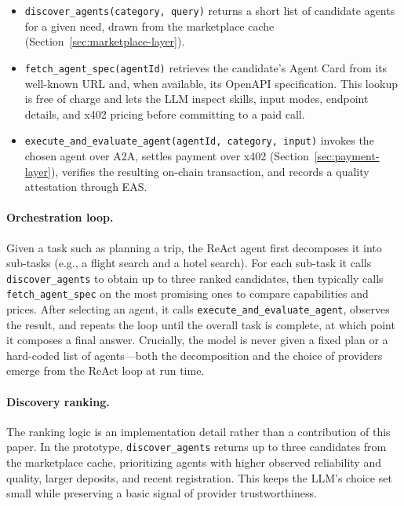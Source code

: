 \documentclass[sigconf]{acmart}
\begin{document}
\begin{sloppypar}
\begin{itemize}
  \item \texttt{discover\_agents(category, query)} returns a short list
    of candidate agents for a given need, drawn from the marketplace
    cache (Section~\ref{sec:marketplace-layer}).
  \item \texttt{fetch\_agent\_spec(agentId)} retrieves the candidate's
    Agent Card from its well-known URL and, when available, its OpenAPI
    specification. This lookup is free of charge and lets the LLM
    inspect skills, input modes, endpoint details, and x402 pricing
    before committing to a paid call.
  \item \texttt{execute\_and\_evaluate\_agent(agentId, category,
    input)} invokes the chosen agent over A2A, settles payment over
    x402 (Section~\ref{sec:payment-layer}), verifies the resulting
    on-chain transaction, and records a quality attestation through EAS.
\end{itemize}
\end{sloppypar}

\paragraph{Orchestration loop.}
Given a task such as planning a trip, the ReAct agent first decomposes
it into sub-tasks (e.g., a flight search and a hotel search). For each
sub-task it calls \texttt{discover\_agents} to obtain up to three ranked
candidates, then typically calls \texttt{fetch\_agent\_spec} on the most
promising ones to compare capabilities and prices. After selecting an
agent, it calls \texttt{execute\_and\_evaluate\_agent}, observes the
result, and repeats the loop until the overall task is complete, at which
point it composes a final answer. Crucially, the model is never given a fixed
plan or a hard-coded list of agents---both the decomposition and the
choice of providers emerge from the ReAct loop at run time.

\paragraph{Discovery ranking.}
The ranking logic is an implementation detail rather than a contribution
of this paper. In the prototype, \texttt{discover\_agents} returns up to
three candidates from the marketplace cache, prioritizing agents with
higher observed reliability and quality, larger deposits, and recent
registration. This keeps the LLM's choice set small while preserving a
basic signal of provider trustworthiness.
\end{document}
